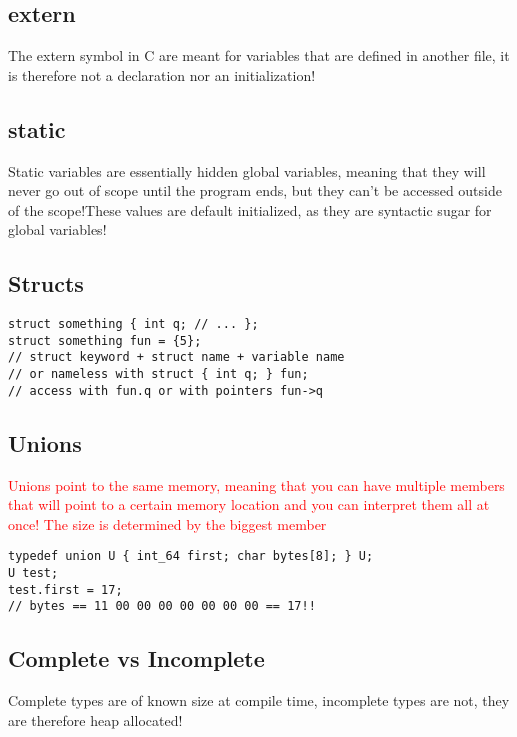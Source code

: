 \documentclass[main.tex,fontsize=8pt,paper=a4,paper=landscape,DIV=calc,]{scrartcl}
\begin{document}
\begin{multicols*}{4}
\subsection{extern}
The extern symbol in C are meant for variables that are defined in another file, it is therefore not a declaration nor an initialization!

\subsection{static}
Static variables are essentially hidden global variables, meaning that they will never go out of scope until the program ends, but they can't be accessed outside of the scope!These values are default initialized, as they are syntactic sugar for global variables!

\subsection{Structs}
\vspace{-2.5mm}
\begin{lstlisting}
struct something { int q; // ... };
struct something fun = {5};
// struct keyword + struct name + variable name
// or nameless with struct { int q; } fun;
// access with fun.q or with pointers fun->q
\end{lstlisting}
\vspace{2mm}

\subsection{Unions}
\textcolor{red}{Unions point to the same memory, meaning that you can have multiple members that will point to a certain memory location and you can interpret them all at once! The size is determined by the biggest member}
\vspace{-2.5mm}
\begin{lstlisting}
typedef union U { int_64 first; char bytes[8]; } U;
U test;
test.first = 17;
// bytes == 11 00 00 00 00 00 00 00 == 17!!
\end{lstlisting}
\vspace{2mm}

\subsection{Complete vs Incomplete}
Complete types are of known size at compile time, incomplete types are not, they are therefore heap allocated!


\end{multicols*}
\end{document}
